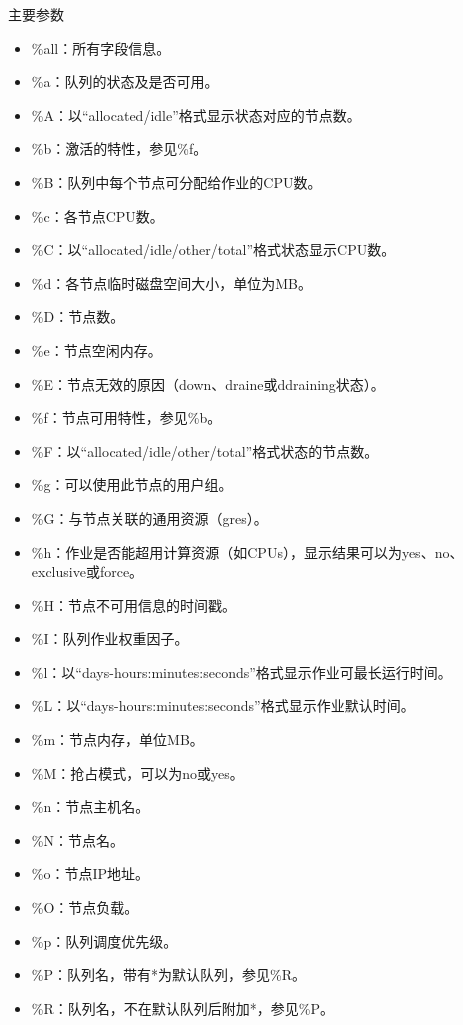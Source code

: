 \begin{frame}{主要参数}
\begin{itemize}
\begin{itemize}
   	\item \%all：所有字段信息。
   	\item \%a：队列的状态及是否可用。
   	\item \%A：以``allocated/idle''格式显示状态对应的节点数。
   	\item \%b：激活的特性，参见\%f。
   	\item \%B：队列中每个节点可分配给作业的CPU数。
   	\item \%c：各节点CPU数。
   	\item \%C：以``allocated/idle/other/total''格式状态显示CPU数。
   	\item \%d：各节点临时磁盘空间大小，单位为MB。
   	\item \%D：节点数。
   	\item \%e：节点空闲内存。
   	\item \%E：节点无效的原因（down、draine或ddraining状态）。
   	\item \%f：节点可用特性，参见\%b。
   	\item \%F：以``allocated/idle/other/total''格式状态的节点数。
   	\item \%g：可以使用此节点的用户组。
   	\item \%G：与节点关联的通用资源（gres）。
   	\item \%h：作业是否能超用计算资源（如CPUs），显示结果可以为yes、no、exclusive或force。
   	\item \%H：节点不可用信息的时间戳。
   	\item \%I：队列作业权重因子。
   	\item \%l：以``days-hours:minutes:seconds''格式显示作业可最长运行时间。
   	\item \%L：以``days-hours:minutes:seconds''格式显示作业默认时间。
   	\item \%m：节点内存，单位MB。
   	\item \%M：抢占模式，可以为no或yes。
   	\item \%n：节点主机名。
   	\item \%N：节点名。
   	\item \%o：节点IP地址。
   	\item \%O：节点负载。
   	\item \%p：队列调度优先级。
   	\item \%P：队列名，带有*为默认队列，参见\%R。
   	\item \%R：队列名，不在默认队列后附加*，参见\%P。

\end{itemize}
\end{itemize}
\end{frame}
